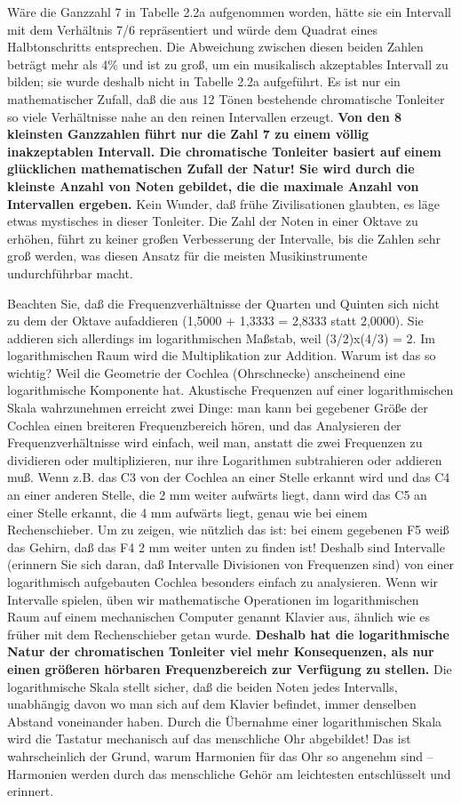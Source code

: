 Wäre die Ganzzahl 7 in Tabelle 2.2a aufgenommen worden, hätte sie ein Intervall mit dem Verhältnis 7/6 repräsentiert und würde dem Quadrat eines Halbtonschritts entsprechen.
Die Abweichung zwischen diesen beiden Zahlen beträgt mehr als 4\% und ist zu groß, um ein musikalisch akzeptables Intervall zu bilden; sie wurde deshalb nicht in Tabelle 2.2a aufgeführt.
Es ist nur ein mathematischer Zufall, daß die aus 12 Tönen bestehende chromatische Tonleiter so viele Verhältnisse nahe an den reinen Intervallen erzeugt.
\textbf{Von den 8 kleinsten Ganzzahlen führt nur die Zahl 7 zu einem völlig inakzeptablen Intervall.
Die chromatische Tonleiter basiert auf einem glücklichen mathematischen Zufall der Natur!
Sie wird durch die kleinste Anzahl von Noten gebildet, die die maximale Anzahl von Intervallen ergeben.}
Kein Wunder, daß frühe Zivilisationen glaubten, es läge etwas mystisches in dieser Tonleiter.
Die Zahl der Noten in einer Oktave zu erhöhen, führt zu keiner großen Verbesserung der Intervalle, bis die Zahlen sehr groß werden, was diesen Ansatz für die meisten Musikinstrumente undurchführbar macht.

Beachten Sie, daß die Frequenzverhältnisse der Quarten und Quinten sich nicht zu dem der Oktave aufaddieren (1,5000 + 1,3333 = 2,8333 statt 2,0000).
Sie addieren sich allerdings im logarithmischen Maßstab, weil (3/2)x(4/3) = 2.
Im logarithmischen Raum wird die Multiplikation zur Addition.
Warum ist das so wichtig?
Weil die Geometrie der Cochlea (Ohrschnecke) anscheinend eine logarithmische Komponente hat.
Akustische Frequenzen auf einer logarithmischen Skala wahrzunehmen erreicht zwei Dinge: man kann bei gegebener Größe der Cochlea einen breiteren Frequenzbereich hören, und das Analysieren der Frequenzverhältnisse wird einfach, weil man, anstatt die zwei Frequenzen zu dividieren oder multiplizieren, nur ihre Logarithmen subtrahieren oder addieren muß.
Wenn z.B. das C3 von der Cochlea an einer Stelle erkannt wird und das C4 an einer anderen Stelle, die 2 mm weiter aufwärts liegt, dann wird das C5 an einer Stelle erkannt, die 4 mm aufwärts liegt, genau wie bei einem Rechenschieber.
Um zu zeigen, wie nützlich das ist: bei einem gegebenen F5 weiß das Gehirn, daß das F4 2 mm weiter unten zu finden ist!
Deshalb sind Intervalle (erinnern Sie sich daran, daß Intervalle Divisionen von Frequenzen sind) von einer logarithmisch aufgebauten Cochlea besonders einfach zu analysieren.
Wenn wir Intervalle spielen, üben wir mathematische Operationen im logarithmischen Raum auf einem mechanischen Computer genannt Klavier aus, ähnlich wie es früher mit dem Rechenschieber getan wurde.
\textbf{Deshalb hat die logarithmische Natur der chromatischen Tonleiter viel mehr Konsequenzen, als nur einen größeren hörbaren Frequenzbereich zur Verfügung zu stellen.}
Die logarithmische Skala stellt sicher, daß die beiden Noten jedes Intervalls, unabhängig davon wo man sich auf dem Klavier befindet, immer denselben Abstand voneinander haben.
Durch die Übernahme einer logarithmischen Skala wird die Tastatur mechanisch auf das menschliche Ohr abgebildet!
Das ist wahrscheinlich der Grund, warum Harmonien für das Ohr so angenehm sind -- Harmonien werden durch das menschliche Gehör am leichtesten entschlüsselt und erinnert.

